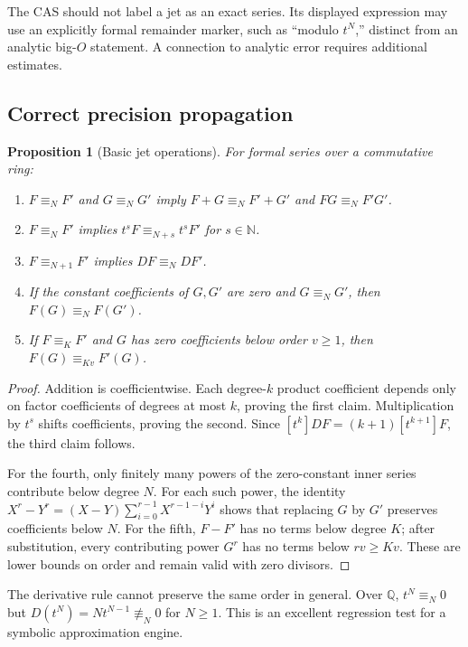 \documentclass[11pt,a4paper]{article}
\newcommand{\N}{\mathbb N}
\newcommand{\Q}{\mathbb Q}
\newcommand{\coeff}[2]{[#1]#2}
\newtheorem{proposition}{Proposition}[section]
\theoremstyle{definition}
\theoremstyle{remark}
\begin{document}
The CAS should not label a jet as an exact series. Its displayed expression may use an explicitly formal remainder marker, such as ``modulo $t^N$,'' distinct from an analytic big-$O$ statement. A connection to analytic error requires additional estimates.

\subsection{Correct precision propagation}
\begin{proposition}[Basic jet operations]\label{prop:jets}
For formal series over a commutative ring:
\begin{enumerate}
\item $F\equiv_N F'$ and $G\equiv_N G'$ imply $F+G\equiv_N F'+G'$ and $FG\equiv_N F'G'$.
\item $F\equiv_N F'$ implies $t^sF\equiv_{N+s}t^sF'$ for $s\in\N$.
\item $F\equiv_{N+1}F'$ implies $DF\equiv_N DF'$.
\item If the constant coefficients of $G,G'$ are zero and $G\equiv_N G'$, then $F(G)\equiv_N F(G')$.
\item If $F\equiv_K F'$ and $G$ has zero coefficients below order $v\ge1$, then $F(G)\equiv_{Kv}F'(G)$.
\end{enumerate}
\end{proposition}
\begin{proof}
Addition is coefficientwise. Each degree-$k$ product coefficient depends only on factor coefficients of degrees at most $k$, proving the first claim. Multiplication by $t^s$ shifts coefficients, proving the second. Since $\coeff{t^k}{DF}=(k+1)\coeff{t^{k+1}}F$, the third claim follows.

For the fourth, only finitely many powers of the zero-constant inner series contribute below degree $N$. For each such power, the identity $X^r-Y^r=(X-Y)\sum_{i=0}^{r-1}X^{r-1-i}Y^i$ shows that replacing $G$ by $G'$ preserves coefficients below $N$. For the fifth, $F-F'$ has no terms below degree $K$; after substitution, every contributing power $G^r$ has no terms below $rv\ge Kv$. These are lower bounds on order and remain valid with zero divisors.
\end{proof}
The derivative rule cannot preserve the same order in general. Over $\Q$, $t^N\equiv_N0$ but $D(t^N)=Nt^{N-1}\not\equiv_N0$ for $N\ge1$. This is an excellent regression test for a symbolic approximation engine.
\end{document}
